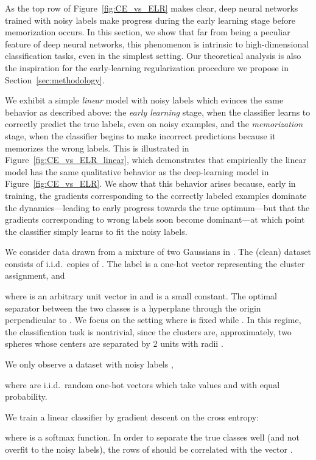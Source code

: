 \documentclass{article}
\newcommand{\1}{\mathds{1}}
\begin{document}
As the top row of Figure~\ref{fig:CE_vs_ELR} makes clear, deep neural networks trained with noisy labels make progress during the early learning stage before memorization occurs.
In this section, we show that far from being a peculiar feature of deep neural networks, this phenomenon is intrinsic to high-dimensional classification tasks, even in the simplest setting.
Our theoretical analysis is also the inspiration for the early-learning regularization procedure we propose in Section~\ref{sec:methodology}.

We exhibit a simple \emph{linear} model with noisy labels which evinces the same behavior as described above: the \emph{early learning} stage, when the classifier learns to correctly predict the true labels, even on noisy examples, and the \emph{memorization} stage, when the classifier begins to make incorrect predictions because it memorizes the wrong labels. This is illustrated in Figure~\ref{fig:CE_vs_ELR_linear}, which demonstrates that empirically the linear model has the same qualitative behavior as the deep-learning model in Figure~\ref{fig:CE_vs_ELR}.
We show that this behavior arises because, early in training, the gradients corresponding to the correctly labeled examples dominate the dynamics---leading to early progress towards the true optimum---but that the gradients corresponding to wrong labels soon become dominant---at which point the classifier simply learns to fit the noisy labels.

We consider data drawn from a mixture of two Gaussians in .
The (clean) dataset consists of  i.i.d.~copies of . The label  is a one-hot vector representing the cluster assignment, and 

where  is an arbitrary unit vector in  and  is a small constant.
The optimal separator between the two classes is a hyperplane through the origin perpendicular to .
We focus on the setting where  is fixed while .
In this regime, the classification task is nontrivial, since the clusters are, approximately, two spheres whose centers are separated by 2 units with radii .

We only observe a dataset with noisy labels , 

where  are i.i.d.~random one-hot vectors which take values  and  with equal probability.

We train a linear classifier by gradient descent on the cross entropy:

where  is a softmax function. In order to separate the true classes well (and not overfit to the noisy labels), the rows of  should be correlated with the vector .
\end{document}
